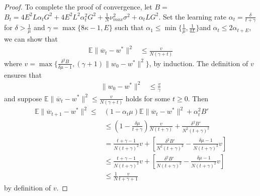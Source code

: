 \begin{proof}
	To complete the proof of convergence, let $B=$ $B_{t}=4E^{2}L\alpha_{t}G^{2}+4E^{2}L^{2}\alpha_{t}^{2}G^{2}+\frac{1}{N}\nu_{max}^{2}\sigma^{2}+\alpha_{t}LG^{2}$.
	Set the learning rate $\alpha_{t}=\frac{\delta}{t+\gamma}$ for $\delta>\frac{1}{\mu}$
	and $\gamma=\max\{8\kappa-1,E\}$ such that $\alpha_{1}\leq\min\{\frac{1}{\mu},\frac{1}{4L}\}$and
	$\alpha_{t}\leq2\alpha_{t+E}$, we can show that 
	\begin{align*}
	\mathbb{E}\|\overline{w}_{t}-w^{\ast}\|^{2} & \leq\frac{v}{N(\gamma+t)}
	\end{align*}
	where $v=\max\{\frac{\delta^{2}B}{\delta\mu-1},(\gamma+1)\|w_{0}-w^{\ast}\|^{2}\}$,
	by induction. The definition of $v$ ensures that 
	\begin{align*}
	\|w_{0}-w^{\ast}\|^{2} & \leq\frac{v}{\gamma}
	\end{align*}
	and suppose $\mathbb{E}\|\overline{w}_{t}-w^{\ast}\|^{2}\leq\frac{v}{N(\gamma+t)}$
	holds for some $t\geq0$. Then 
	\begin{align*}
	\mathbb{E}\|\overline{w}_{t+1}-w^{\ast}\|^{2}\leq & (1-\alpha_{t}\mu)\mathbb{E}\|\overline{w}_{t}-w^{\ast}\|^{2}+\alpha_{t}^{2}B'\\
	& \leq(1-\frac{\delta\mu}{t+\gamma})\frac{v}{N(t+\gamma)}+\frac{\delta^{2}B'}{N^{2}(t+\gamma)^{2}}\\
	& =\frac{t+\gamma-1}{N(t+\gamma)^{2}}v+\left[\frac{\delta^{2}B'}{N^{2}(t+\gamma)^{2}}-\frac{\delta\mu-1}{N(t+\gamma)^{2}}v\right]\\
	& \leq\frac{t+\gamma-1}{N(t+\gamma)^{2}}v+\left[\frac{\delta^{2}B'}{N(t+\gamma)^{2}}-\frac{\delta\mu-1}{N(t+\gamma)^{2}}v\right]\\
	& \leq\frac{1}{N}\frac{v}{t+\gamma+1}
	\end{align*}
	by definition of $v$.
	

\end{proof}
